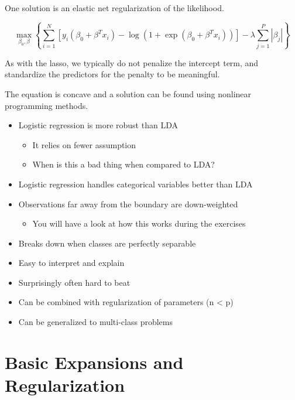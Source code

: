 One solution is an elastic net regularization of the likelihood.

\[
    \max\limits_{\beta_0, \beta} \left\{\sum_{i=1}^{N} \left[ y_i (\beta_0 + \beta^T x_i) - \log (1 + \exp(\beta_0 + \beta^T x_i)) \right] - \lambda \sum_{j=1}^{P} |\beta_j | \right\}
\]

As with the lasso, we typically do not penalize the intercept term, and standardize the predictors for the penalty to be meaningful.

The equation is concave and a solution can be found using nonlinear programming methods.

\begin{itemize}
  \item Logistic regression is more robust than LDA
  \begin{itemize}
    \item It relies on fewer assumption
    \item When is this a bad thing when compared to LDA?
  \end{itemize}
  \item Logistic regression handles categorical variables better than LDA
  \item Observations far away from the boundary are down-weighted
  \begin{itemize}
    \item You will have a look at how this works during the exercises
  \end{itemize}
  \item Breaks down when classes are perfectly separable
  \item Easy to interpret and explain
  \item Surprisingly often hard to beat
  \item Can be combined with regularization of parameters (n < p)
  \item Can be generalized to multi-class problems
\end{itemize}

\section{Basic Expansions and Regularization}

